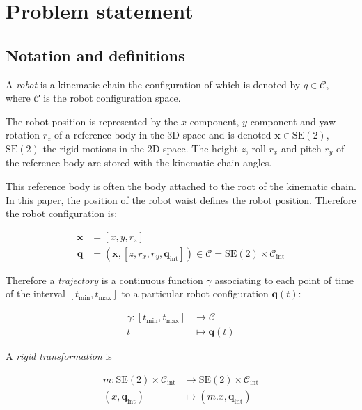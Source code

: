 \section{Problem statement} \label{problem}
\subsection{Notation and definitions}

A \emph{robot} is a kinematic chain the configuration of which is
denoted by \mbox{$q \in \mathcal{C}$}, where $\mathcal{C}$ is the
robot configuration space.

The robot position is represented by the $x$ component, $y$ component
and yaw rotation $r_z$ of a reference body in the 3D space and is
denoted \mbox{$\mathbf{x} \in \text{SE}(2)$, $\text{SE}(2)$} the rigid
motions in the 2D space.  The height $z$, roll $r_x$ and pitch $r_y$
of the reference body are stored with the kinematic chain angles.

This reference body is often the body attached to the root of the
kinematic chain. In this paper, the position of the robot waist
defines the robot position. Therefore the robot configuration is:

\begin{equation} \label{eq:cfg}
  \begin{aligned}
    \mathbf{x} &= [x, y, r_z]\\
    \mathbf{q} &= (\mathbf{x}, [z, r_x, r_y, \mathbf{q}_{\text{int}}])
    \in \mathcal{C} = \text{SE}(2) \times \mathcal{C}_{\text{int}}
  \end{aligned}
\end{equation}



Therefore a \emph{trajectory} is a continuous function $\gamma$
associating to each point of time of the interval
\mbox{$[t_{\text{min}}, t_{\text{max}}]$} to a particular robot
configuration \mbox{$\textbf{q}(t)$}:

\begin{equation} \label{eq:traj}
  \begin{aligned}
    \gamma \colon [t_{\text{min}}, t_{\text{max}}] &\to \mathcal{C}\\
    t &\mapsto \mathbf{q}(t)
  \end{aligned}
\end{equation}


A \emph{rigid transformation} is

\begin{equation} \label{eq:rigidtrans}
  \begin{aligned}
    m \colon \text{SE}(2) \times \mathcal{C}_{\text{int}} &\to \text{SE}(2) \times \mathcal{C}_{\text{int}}\\
    (x, \mathbf{q}_{\text{int}}) &\mapsto (m . x, \mathbf{q}_{\text{int}})
  \end{aligned}
\end{equation}


